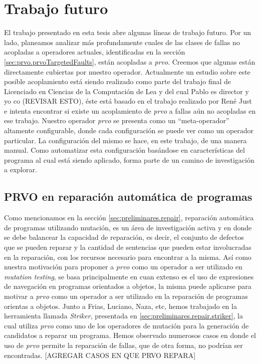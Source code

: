 \chapter[Trabajo futuro]{Trabajo futuro}
\label{sec:futurework}

El trabajo presentado en esta tesis abre algunas l\'ineas de trabajo futuro. Por un lado, planeamos analizar m\'as profundamente cuales de las clases de fallas no acopladas a operadores actuales, identificadas en la secci\'on \ref{sec:prvo.prvoTargetedFaults}, est\'an acopladas a \emph{prvo}. Creemos que algunas est\'an directamente cubiertas por nuestro operador. Actualmente un estudio sobre este posible acoplamiento est\'a siendo realizado como parte del trabajo final de Licenciado en Ciencias de la Computaci\'on de Lea y del cual Pablo es director y yo co (REVISAR ESTO), \'este est\'a basado en el trabajo realizado por Ren\'e Just \cite{bibliography.mutation.evaluation.valid-substitute} e intenta encontrar si existe un acoplamiento de \emph{prvo} a fallas a\'un no acopladas en ese trabajo. Nuestro operador \emph{prvo} se presenta como un ``meta-operador'' altamente configurable, donde cada configuraci\'on se puede ver como un operador particular. La configuraci\'on del mismo se hace, en este trabajo, de una manera manual. Como automatizar esta configuraci\'on bas\'andose en caracter\'isticas del programa al cual est\'a siendo aplicado, forma parte de un camino de investigaci\'on a explorar. 

\section{PRVO en reparaci\'on autom\'atica de programas}

Como mencionamos en la secci\'on \ref{sec:preliminares.repair}, reparaci\'on autom\'atica de programas utilizando mutaci\'on, es un \'area de investigaci\'on activa y en donde se debe balancear la capacidad de reparaci\'on, es decir, el conjunto de defectos que se pueden reparar y la cantidad de sentencias que pueden estar involucradas en la reparaci\'on, con los recursos necesario para encontrar a la misma. As\'i como nuestra motivaci\'on para proponer a \emph{prvo} como un operador a ser utilizado en \emph{mutation testing}, se basa principalmente en cuan extenso es el uso de expresiones de navegaci\'on en programas orientados a objetos, la misma puede aplicarse para motivar a \emph{prvo} como un operador a ser utilizado en la reparaci\'on de programas orientas a objetos. Junto a Frias, Luciano, Naza, etc, hemos trabajado en la herramienta llamada \emph{Striker}, presentada en \ref{sec:preliminares.repair.striker}, la cual utiliza \emph{prvo} como uno de los operadores de mutaci\'on para la generaci\'on de candidatos a reparar un programa. Hemos observado numerosos casos en donde el uso de \emph{prvo} permite la reparaci\'on de fallas, que de otra forma, no podr\'ian ser encontradas. [AGREGAR CASOS EN QUE PRVO REPARA]
